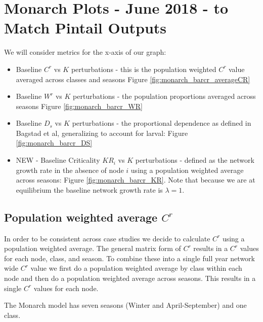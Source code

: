 \documentclass[10pt]{article}
\begin{document}
\section{Monarch Plots - June 2018 - to Match Pintail Outputs}

We will consider metrics for the x-axis of our graph:
\begin{itemize}
\item Baseline $C^r$ vs $K$ perturbations - this is the population weighted $C^r$ value averaged across classes and seasons Figure \ref{fig:monarch_barcr_averageCR}
\item Baseline $W^r$ vs $K$ perturbations - the population proportions averaged across seasons Figure \ref{fig:monarch_barcr_WR}
\item Baseline $D_s$ vs $K$ perturbations - the proportional dependence as defined in Bagstad et al, generalizing to account for larval: Figure \ref{fig:monarch_barcr_DS}
\item NEW - Baseline Criticality $KR_i$ vs $K$ perturbations - defined as the network growth rate in the absence of node $i$ using a population weighted average across seasons: Figure \ref{fig:monarch_barcr_KR}. Note that because we are at equilibrium the baseline network growth rate is $\lambda = 1$.
\end{itemize}

\newpage
\subsection{Population weighted average \texorpdfstring{$C^r$}{CR}}

In order to be consistent across case studies we decide to calculate $C^r$ using a population weighted average. The general matrix form of $C^r$ results in a $C^r$ values for each node, class, and season. To combine these into a single full year network wide $C^r$ value we first do a population weighted average by class within each node and then do a population weighted average across seasons. This results in a single $C^r$ values for each node.

The Monarch model has seven seasons (Winter and April-September) and one class.
\end{document}
